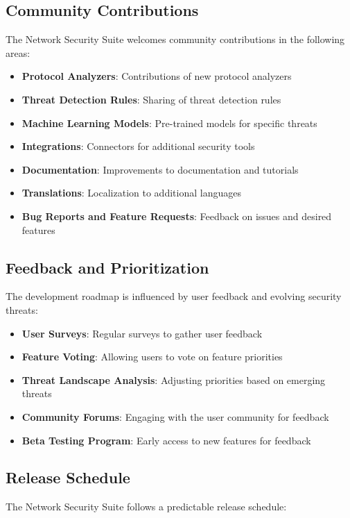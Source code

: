 \subsection{Community Contributions}
The Network Security Suite welcomes community contributions in the following areas:

\begin{itemize}
    \item \textbf{Protocol Analyzers}: Contributions of new protocol analyzers
    \item \textbf{Threat Detection Rules}: Sharing of threat detection rules
    \item \textbf{Machine Learning Models}: Pre-trained models for specific threats
    \item \textbf{Integrations}: Connectors for additional security tools
    \item \textbf{Documentation}: Improvements to documentation and tutorials
    \item \textbf{Translations}: Localization to additional languages
    \item \textbf{Bug Reports and Feature Requests}: Feedback on issues and desired features
\end{itemize}

\subsection{Feedback and Prioritization}
The development roadmap is influenced by user feedback and evolving security threats:

\begin{itemize}
    \item \textbf{User Surveys}: Regular surveys to gather user feedback
    \item \textbf{Feature Voting}: Allowing users to vote on feature priorities
    \item \textbf{Threat Landscape Analysis}: Adjusting priorities based on emerging threats
    \item \textbf{Community Forums}: Engaging with the user community for feedback
    \item \textbf{Beta Testing Program}: Early access to new features for feedback
\end{itemize}

\subsection{Release Schedule}
The Network Security Suite follows a predictable release schedule:

